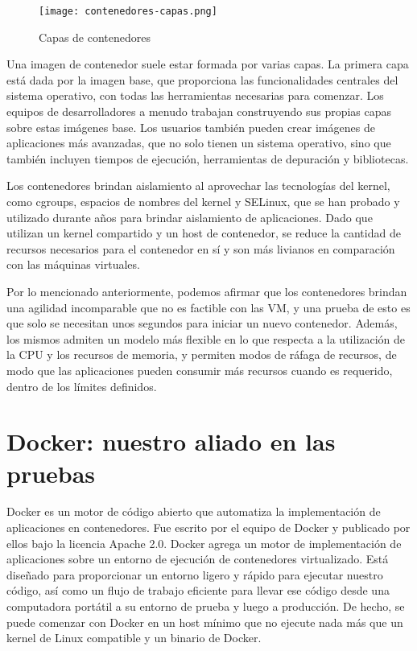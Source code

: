 \begin{center}
    \begin{figure}   
       \begin{center}
          \texttt{[image: contenedores-capas.png]}
       \end{center}
       \caption{Capas de contenedores}
    \end{figure}
 \end{center}

Una imagen de contenedor suele estar formada por varias capas.
La primera capa está dada por la imagen base, que proporciona las funcionalidades 
centrales del sistema operativo, con todas las herramientas necesarias para comenzar. 
Los equipos de desarrolladores a menudo trabajan construyendo sus propias capas sobre 
estas imágenes base. Los usuarios también pueden crear imágenes de aplicaciones más 
avanzadas, que no solo tienen un sistema operativo, sino que también incluyen tiempos 
de ejecución, herramientas de depuración y bibliotecas.

Los contenedores brindan aislamiento al aprovechar las tecnologías del kernel, como 
cgroups, espacios de nombres del kernel y SELinux, que se han probado y utilizado 
durante años para brindar aislamiento de aplicaciones. Dado que  
utilizan un kernel compartido y un host de contenedor, se reduce la cantidad de 
recursos necesarios para el contenedor en sí y son más livianos en comparación 
con las máquinas virtuales. 

Por lo mencionado anteriormente, podemos afirmar que los contenedores brindan una agilidad 
incomparable que no es factible con las VM, y una prueba de esto es que solo se 
necesitan unos segundos para iniciar un nuevo contenedor. 
Además, los mismos admiten un 
modelo más flexible en lo que respecta a la utilización de la CPU y los recursos 
de memoria, y permiten modos de ráfaga de recursos, de modo que las aplicaciones 
pueden consumir más recursos cuando es requerido, dentro de los límites definidos.


\section{Docker: nuestro aliado en las pruebas}

Docker es un motor de código abierto que automatiza la implementación de aplicaciones 
en contenedores. Fue escrito por el equipo de Docker y publicado por ellos bajo la 
licencia Apache 2.0. Docker agrega un motor de implementación de aplicaciones sobre 
un entorno de ejecución de contenedores virtualizado. Está diseñado para proporcionar 
un entorno ligero y rápido para ejecutar nuestro código, así como un flujo de trabajo 
eficiente para llevar ese código desde una computadora portátil a su entorno de prueba 
y luego a producción. De hecho, se puede comenzar con Docker en un host mínimo que 
no ejecute nada más que un kernel de Linux compatible y un binario de Docker.

